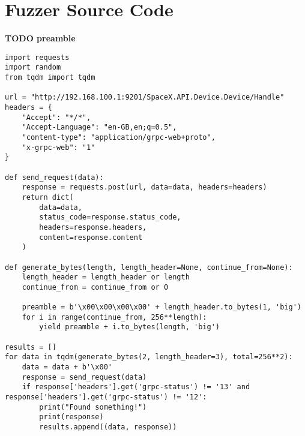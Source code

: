 \section{Fuzzer Source Code}\label{app:fuzzer}

\textbf{TODO preamble}

\begin{lstlisting}
import requests
import random
from tqdm import tqdm

url = "http://192.168.100.1:9201/SpaceX.API.Device.Device/Handle"
headers = {
    "Accept": "*/*",
    "Accept-Language": "en-GB,en;q=0.5",
    "content-type": "application/grpc-web+proto",
    "x-grpc-web": "1"
}

def send_request(data):
    response = requests.post(url, data=data, headers=headers)
    return dict(
        data=data,
        status_code=response.status_code,
        headers=response.headers,
        content=response.content
    )

def generate_bytes(length, length_header=None, continue_from=None):
    length_header = length_header or length
    continue_from = continue_from or 0

    preamble = b'\x00\x00\x00\x00' + length_header.to_bytes(1, 'big')
    for i in range(continue_from, 256**length):
        yield preamble + i.to_bytes(length, 'big')

results = []
for data in tqdm(generate_bytes(2, length_header=3), total=256**2):
    data = data + b'\x00'
    response = send_request(data)
    if response['headers'].get('grpc-status') != '13' and response['headers'].get('grpc-status') != '12':
        print("Found something!")
        print(response)
        results.append((data, response))
\end{lstlisting}